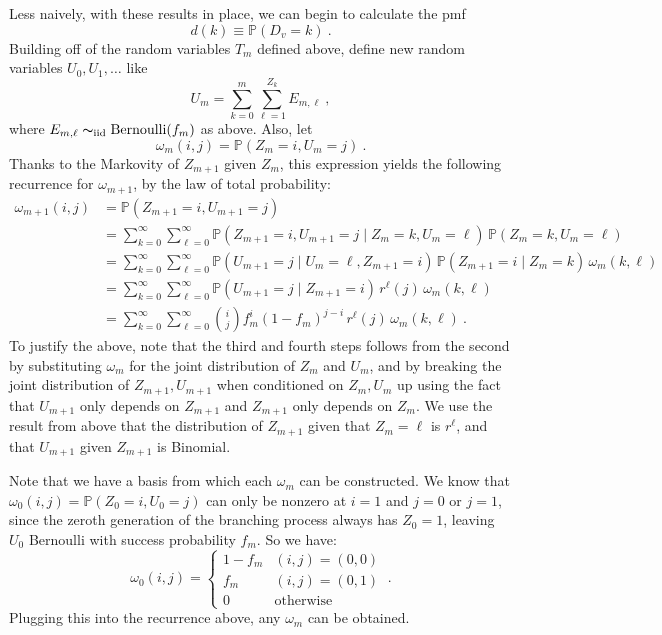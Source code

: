 \documentclass[12pt]{article}
\newcommand{\iid}{\mathrm{iid}}
\renewcommand{\P}{\mathbb{P}}
\begin{document}
Less naively, with these results in place, we can begin to calculate the pmf
\[d(k)\equiv \P(D_v = k)\ .\]
Building off of the random variables $T_m$ defined above, define new random
variables $U_0,U_1,\dotsc$ like \[U_m = \sum_{k=0}^m \sum_{\ell=1}^{Z_k} E_{m,\ell}\ ,\]
where $E_{m,\ell}\thicksim_\iid \text{Bernoulli}(f_m)$ as above. Also, let
\[ \omega_m(i, j)=\P(Z_m=i, U_m=j)\ .\] Thanks to the Markovity of $Z_{m+1}$ given
$Z_m$, this expression yields the following recurrence for $\omega_{m+1}$, 
by the law of total probability:
\begin{align*}
\omega_{m+1}(i,j)&=\P(Z_{m+1}=i, U_{m+1}=j)\\
&= \sum_{k=0}^\infty \sum_{\ell=0}^\infty \P(Z_{m+1}=i,U_{m+1}=j\mid Z_m=k, U_m=\ell)\,\P(Z_m=k,U_m=\ell)\\
&= \sum_{k=0}^\infty\sum_{\ell=0}^\infty \P(U_{m+1}=j\mid U_m=\ell,Z_{m+1}=i)\,\P(Z_{m+1}=i\mid Z_m=k)\,\omega_m(k,\ell) \\
&= \sum_{k=0}^\infty\sum_{\ell=0}^\infty \P(U_{m+1}=j\mid Z_{m+1}=i)\,r^\ell(j)\,\omega_m(k,\ell) \\
&= \sum_{k=0}^\infty\sum_{\ell=0}^\infty \binom{i}{j} f_m^i (1 - f_m)^{j-i}\,r^\ell(j)\,\omega_m(k,\ell) \ .
\end{align*}
To justify the above, note that the third and fourth steps follows from the second by substituting
$\omega_m$ for the joint distribution of $Z_m$ and $U_m$, and by breaking the joint
distribution of $Z_{m+1},U_{m+1}$ when conditioned on $Z_m,U_m$ up using the fact that
$U_{m+1}$ only depends on $Z_{m+1}$ and $Z_{m+1}$ only depends on $Z_m$. We use the
result from above that the distribution of $Z_{m+1}$ given that $Z_m=\ell$ is $r^\ell$,
and that $U_{m+1}$ given $Z_{m+1}$ is Binomial.\par

Note that we have a basis from which each $\omega_m$ can be constructed. We know that
$\omega_0(i, j) = \P(Z_0=i,U_0=j)$ can only be nonzero at $i=1$ and $j=0$ or $j=1$,
since the zeroth generation of the branching process always has $Z_0=1$, leaving
$U_0$ Bernoulli with success probability $f_m$. So we have:
\[ \omega_0(i,j) = \begin{cases} 1 - f_m & (i,j)=(0,0) \\ f_m & (i,j)=(0,1) \\ 0 & \text{otherwise}\end{cases}\ .\]
Plugging this into the recurrence above, any $\omega_m$ can be obtained.\par
\end{document}
